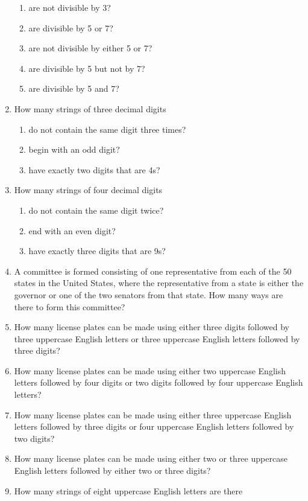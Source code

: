 \documentclass[11pt,a4paper]{book}
\begin{document}
\begin{enumerate}
\begin{enumerate}[label=(\alph*)]
\item are not divisible by 3?
\item are divisible by 5 or 7?
\item are not divisible by either 5 or 7?
\item are divisible by 5 but not by 7?
\item are divisible by 5 and 7?
\end{enumerate}
\item How many strings of three decimal digits
\begin{enumerate}[label=(\alph*)]
\item do not contain the same digit three times?
\item begin with an odd digit?
\item have exactly two digits that are 4s?
\end{enumerate}
\item How many strings of four decimal digits
\begin{enumerate}[label=(\alph*)]
\item do not contain the same digit twice?
\item end with an even digit?
\item have exactly three digits that are 9s?
\end{enumerate}
\item A committee is formed consisting of one representative from each of the 50 states in the United States, where the representative from a state is either the governor or one of the two senators from that state.
How many ways are there to form this committee?
\item How many license plates can be made using either three digits followed by three uppercase English letters or three uppercase English letters followed by three digits?
\item How many license plates can be made using either two uppercase English letters followed by four digits or two digits followed by four uppercase English letters?
\item How many license plates can be made using either three uppercase English letters followed by three digits or four uppercase English letters followed by two digits?
\item How many license plates can be made using either two or three uppercase English letters followed by either two or three digits?
\item How many strings of eight uppercase English letters are there

\end{enumerate}
\end{document}
